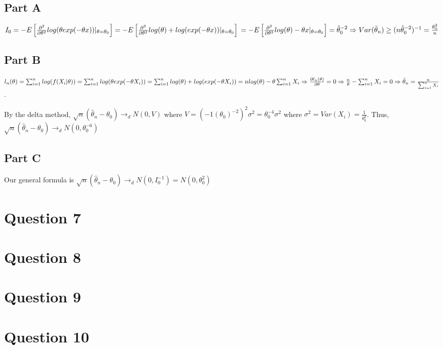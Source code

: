 \documentclass[11pt]{article} %
\begin{document}
\subsection{Part A}
$I_0 = -E\left[ \frac{\partial^2}{\partial \theta^2} log(\theta exp(-\theta x))|_{\theta = \theta_0} \right] = -E\left[ \frac{\partial^2}{\partial \theta^2} log(\theta)+ log(exp(-\theta x)) |_{\theta = \theta_0}\right] \\= -E\left[ \frac{\partial^2}{\partial \theta^2} log(\theta)-\theta x |_{\theta = \theta_0}\right] = \hat{\theta}^{-2}_0 \Rightarrow Var(\bar{\theta}_n) \geq (n \hat{\theta}^{-2}_0)^{-1} = \frac{ \theta^{2}_0}{n}$
\subsection{Part B}
$l_n(\theta) = \sum_{i=1}^nlog(f(X_i|\theta)) = \sum_{i=1}^nlog(\theta exp(-\theta X_i)) = \sum_{i=1}^nlog(\theta)+ log(exp(-\theta X_i)) \\ = nlog(\theta)- \theta\sum_{i=1}^n X_i \Rightarrow \frac{\partial l_n(\theta)}{\partial \theta} = 0 \Rightarrow \frac{n}{\theta} - \sum_{i=1}^n X_i = 0 \Rightarrow \hat{\theta}_n =  \frac{n}{\sum_{i=1}^n X_i}$. 

By the delta method, $\sqrt{n}(\hat{\theta}_n - \theta_0) \rightarrow_d N(0,V)$ where $V = (-1(\theta_0)^{-2})^2 \sigma^2 = \theta_0^{-4}\sigma^2$ where $\sigma^2 = Var(X_i) =  \frac{1}{\theta_0^2}$. Thus, $\sqrt{n}(\hat{\theta}_n - \theta_0) \rightarrow_d N(0,\theta_0^{-6})$
\subsection{Part C}
Our general formula is $\sqrt{n}(\hat{\theta}_n - \theta_0) \rightarrow_d N(0,I_0^{-1}) = N(0,\theta_0^2)$
\section{Question 7} %
\section{Question 8} %
\section{Question 9} %
\section{Question 10}  %
\end{document}
